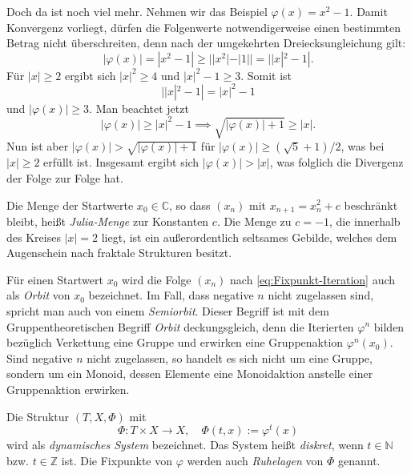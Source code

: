 \documentclass[a4paper,11pt,fleqn,twoside]{scrartcl}
\numberwithin{equation}{section}
\newcommand{\N}{\mathbb N}
\newcommand{\Z}{\mathbb Z}
\newcommand{\C}{\mathbb C}
\newcommand{\strong}[1]{{\sf\bfseries #1}}
\newenvironment{Definition}{\par\noindent\strong{Definition.}}{\par}
\begin{document}
Doch da ist noch viel mehr. Nehmen wir das Beispiel
$\varphi(x)=x^2-1$. Damit Konvergenz vorliegt, dürfen die Folgenwerte
notwendigerweise einen bestimmten Betrag nicht überschreiten, denn
nach der umgekehrten Dreiecksungleichung gilt:
\begin{equation}
|\varphi(x)| = |x^2-1| \ge ||x^2|-|1|| = ||x|^2-1|.
\end{equation}
Für $|x|\ge 2$ ergibt sich $|x|^2\ge 4$ und $|x|^2-1\ge 3$.
Somit ist
\begin{equation}
||x|^2-1| = |x|^2-1
\end{equation}
und $|\varphi(x)|\ge 3$.
Man beachtet jetzt
\begin{equation}
|\varphi(x)|\ge |x|^2-1 \implies \sqrt{|\varphi(x)|+1}\ge |x|.
\end{equation}
Nun ist aber $|\varphi(x)|>\sqrt{|\varphi(x)|+1}$ für
$|\varphi(x)|\ge (\sqrt{5}+1)/2$, was bei $|x|\ge 2$ erfüllt ist.
Insgesamt ergibt sich $|\varphi(x)|>|x|$, was folglich die Divergenz
der Folge zur Folge hat.

Die Menge der Startwerte $x_0\in\C$, so dass
$(x_n)$ mit $x_{n+1}=x_n^2+c$ beschränkt bleibt,
heißt \emph{Julia-Menge} zur Konstanten $c$. Die Menge zu $c=-1$,
die innerhalb des Kreises $|x|=2$ liegt, ist ein außerordentlich
seltsames Gebilde, welches dem Augenschein nach
fraktale Strukturen besitzt.

Für einen Startwert $x_0$ wird die Folge $(x_n)$ nach
\eqref{eq:Fixpunkt-Iteration} auch als \emph{Orbit}
von $x_0$ bezeichnet. Im Fall, dass negative $n$ nicht zugelassen
sind, spricht man auch von einem \emph{Semiorbit}. Dieser Begriff
ist mit dem Gruppentheoretischen Begriff \emph{Orbit} deckungsgleich,
denn die Iterierten $\varphi^n$ bilden bezüglich Verkettung
eine Gruppe und erwirken eine Gruppenaktion $\varphi^n(x_0)$.
Sind negative $n$ nicht zugelassen,
so handelt es sich nicht um eine Gruppe, sondern um ein Monoid,
dessen Elemente eine Monoidaktion anstelle einer Gruppenaktion
erwirken.

\begin{Definition}
Die Struktur $(T,X,\Phi)$ mit
\begin{equation}
\Phi\colon T\times X\to X,\quad\Phi(t,x):=\varphi^t(x)
\end{equation}
wird als \emph{dynamisches System} bezeichnet. Das System heißt
\emph{diskret}, wenn $t\in\N$ bzw. $t\in\Z$ ist. Die Fixpunkte
von $\varphi$ werden auch \emph{Ruhelagen} von $\Phi$ genannt.
\end{Definition}
\end{document}
